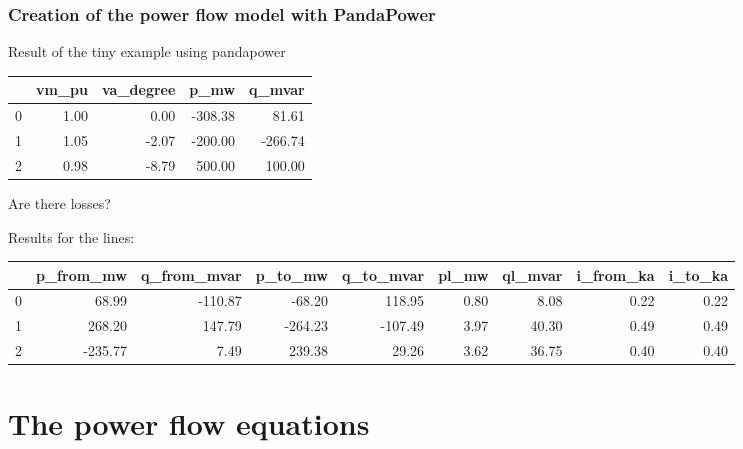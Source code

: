 \begin{frame}
    \frametitle{Creation of the power flow model with PandaPower}
    \begin{center}
        
    \end{center}
\end{frame}

\begin{frame}{Result of the tiny example using pandapower}
    
    \begin{center}
     {\scriptsize    
    \begin{tabular}{|l|r|r|r|r|}
        \hline
        & \textbf{vm\_pu} & \textbf{va\_degree} & \textbf{p\_mw} & \textbf{q\_mvar} \\
        \hline
        0 & 1.00 & 0.00 & -308.38 & 81.61 \\
        \hline
        1 & 1.05 & -2.07 & -200.00 & -266.74 \\
        \hline
        2 & 0.98 & -8.79 & 500.00 & 100.00 \\
        \hline
    \end{tabular}
     }
\end{center}

    Are there losses?
    
    Results for the lines:
    {\scriptsize
    \begin{tabular}{|l|r|r|r|r|r|r|r|r|}
        \hline
        & \textbf{p\_from\_mw} & \textbf{q\_from\_mvar} & \textbf{p\_to\_mw} & \textbf{q\_to\_mvar} & \textbf{pl\_mw} & \textbf{ql\_mvar} & \textbf{i\_from\_ka} & \textbf{i\_to\_ka} \\
        \hline
        0 & 68.99 & -110.87 & -68.20 & 118.95 & 0.80 & 8.08 & 0.22 & 0.22 \\
        \hline
        1 & 268.20 & 147.79 & -264.23 & -107.49 & 3.97 & 40.30 & 0.49 & 0.49 \\
        \hline
        2 & -235.77 & 7.49 & 239.38 & 29.26 & 3.62 & 36.75 & 0.40 & 0.40 \\
        \hline
    \end{tabular}
    }
\end{frame}

\section{The power flow equations}

